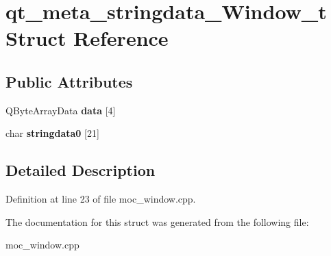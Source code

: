 \hypertarget{structqt__meta__stringdata__Window__t}{}\section{qt\+\_\+meta\+\_\+stringdata\+\_\+\+Window\+\_\+t Struct Reference}
\label{structqt__meta__stringdata__Window__t}
\subsection*{Public Attributes}
\begin{DoxyCompactItemize}
\item 
\mbox{\label{structqt__meta__stringdata__Window__t_a37256c7c00679f7d056f8ddb47da92f2}} 
Q\+Byte\+Array\+Data {\bfseries data} \mbox{[}4\mbox{]}
\item 
\mbox{\label{structqt__meta__stringdata__Window__t_af069c37d914887528528655661c37242}} 
char {\bfseries stringdata0} \mbox{[}21\mbox{]}
\end{DoxyCompactItemize}


\subsection{Detailed Description}


Definition at line 23 of file moc\+\_\+window.\+cpp.



The documentation for this struct was generated from the following file\+:\begin{DoxyCompactItemize}
\item 
moc\+\_\+window.\+cpp\end{DoxyCompactItemize}
